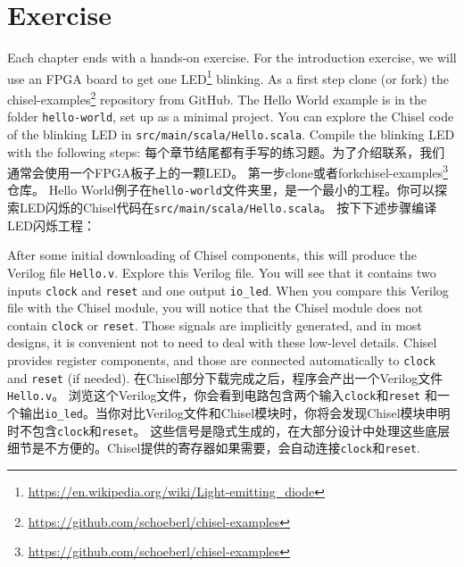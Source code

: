 \documentclass[%
    10pt,
    headinclude, footexclude,
    openright, %
    notitlepage,
    cleardoubleempty,
    headsepline,
    pointlessnumbers,
    bibtotoc, idxtotoc,
    ]{scrbook}
\newcommand{\code}[1]{{\small{\texttt{#1}}}}
\newcommand{\myref}[2]{\href{#1}{#2}}
\renewcommand{\myref}[2]{{#2}{\footnote{\url{#1}}}}
\begin{document}
\section{Exercise}

Each chapter ends with a hands-on exercise. For the introduction exercise, we will use an
FPGA board to get one \myref{https://en.wikipedia.org/wiki/Light-emitting_diode}{LED} blinking.
As a first step clone (or fork) the \myref{https://github.com/schoeberl/chisel-examples}{chisel-examples}
repository from GitHub.
The Hello World example is in the folder \code{hello-world}, set up as
a minimal project. You can explore the Chisel code of the blinking LED
in \code{src/main/scala/Hello.scala}.
Compile the blinking LED with the following steps:
每个章节结尾都有手写的练习题。为了介绍联系，我们通常会使用一个FPGA板子上的一颗LED。
第一步clone或者fork\myref{https://github.com/schoeberl/chisel-examples}{chisel-examples}仓库。 
Hello World例子在\code{hello-world}文件夹里，是一个最小的工程。你可以探索LED闪烁的Chisel代码在\code{src/main/scala/Hello.scala}。
按下下述步骤编译LED闪烁工程：


After some initial downloading of Chisel components, this will produce the Verilog file \code{Hello.v}.
Explore this Verilog file. You will see that it contains two inputs \code{clock} and \code{reset}
and one output \code{io\_led}. When you compare this Verilog file with the Chisel module,
you will notice that the Chisel module does not contain \code{clock} or \code{reset}.
Those signals are implicitly generated, and in most designs, it is convenient not to need to
deal with these low-level details. Chisel provides register components, and those
are connected automatically to \code{clock} and \code{reset} (if needed).
在Chisel部分下载完成之后，程序会产出一个Verilog文件\code{Hello.v}。
浏览这个Verilog文件，你会看到电路包含两个输入\code{clock}和\code{reset}
和一个输出\code{io\_led}。当你对比Verilog文件和Chisel模块时，你将会发现Chisel模块申明时不包含\code{clock}和\code{reset}。
这些信号是隐式生成的，在大部分设计中处理这些底层细节是不方便的。Chisel提供的寄存器如果需要，会自动连接\code{clock}和\code{reset}.
\end{document}
